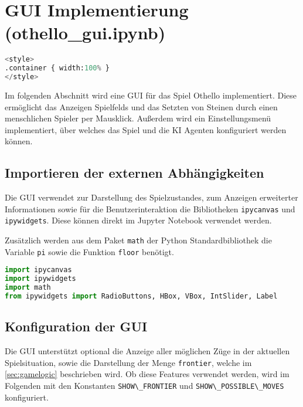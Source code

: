 \hypertarget{gui-implementierung-othello_gui.ipynb}{%
\section{GUI Implementierung
(othello\_gui.ipynb)}\label{gui-implementierung-othello_gui.ipynb}}

\label{sec:gui}

\begin{lstlisting}[language=Python]
%%HTML
<style>
.container { width:100% }
</style>
\end{lstlisting}

Im folgenden Abschnitt wird eine \ac{GUI} für das Spiel Othello
implementiert. Diese ermöglicht das Anzeigen Spielfelds und das Setzten
von Steinen durch einen menschlichen Spieler per Mausklick. Außerdem
wird ein Einstellungsmenü implementiert, über welches das Spiel und die
\ac{KI} Agenten konfiguriert werden können.

\hypertarget{importieren-der-externen-abhuxe4ngigkeiten}{%
\subsection{Importieren der externen
Abhängigkeiten}\label{importieren-der-externen-abhuxe4ngigkeiten}}

Die \ac{GUI} verwendet zur Darstellung des Spielzustandes, zum Anzeigen
erweiterter Informationen sowie für die Benutzerinteraktion die
Bibliotheken \passthrough{\lstinline!ipycanvas!} und
\passthrough{\lstinline!ipywidgets!}. Diese können direkt im Jupyter
Notebook verwendet werden.

Zusätzlich werden aus dem Paket \passthrough{\lstinline!math!} der
Python Standardbibliothek die Variable \passthrough{\lstinline!pi!}
sowie die Funktion \passthrough{\lstinline!floor!} benötigt.

\begin{lstlisting}[language=Python]
import ipycanvas
import ipywidgets
import math
from ipywidgets import RadioButtons, HBox, VBox, IntSlider, Label
\end{lstlisting}

\hypertarget{konfiguration-der-gui}{%
\subsection{Konfiguration der GUI}\label{konfiguration-der-gui}}

Die \ac{GUI} unterstützt optional die Anzeige aller möglichen Züge in
der aktuellen Spielsituation, sowie die Darstellung der Menge
\passthrough{\lstinline!frontier!}, welche im \autoref{sec:gamelogic}
beschrieben wird. Ob diese Features verwendet werden, wird im Folgenden
mit den Konstanten \passthrough{\lstinline!SHOW\_FRONTIER!} und
\passthrough{\lstinline!SHOW\_POSSIBLE\_MOVES!} konfiguriert.

